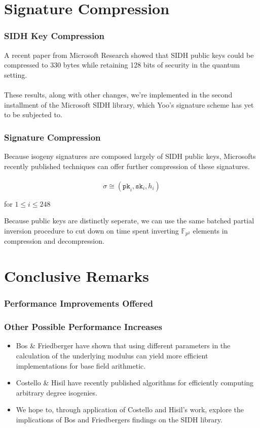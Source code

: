 \documentclass{beamer}
\begin{document}
\section{Signature Compression}

\begin{frame}
\frametitle{SIDH Key Compression}
A recent paper from Microsoft Research showed that SIDH public keys could be compressed to 330 bytes while retaining 128 bits of security in the quantum setting.\\~\\

These results, along with other changes, we're implemented in the second installment of the Microsoft SIDH library, which Yoo's signature scheme has yet to be subjected to.\\
\end{frame}

\begin{frame}
\frametitle{Signature Compression}
Because isogeny signatures are composed largely of SIDH public keys, Microsofts recently published techniques can offer further compression of these signatures.\\~\\

$$
\sigma \cong (\texttt{pk}_i, \texttt{sk}_i, h_i)
$$
\begin{center}for $1 \leq i \leq 248$\end{center}

Because public keys are distinctly seperate, we can use the same batched partial inversion procedure to cut down on time spent inverting $\mathbb{F}_{p^{2}}$ elements in compression and decompression.
\end{frame}

\section{Conclusive Remarks}

\begin{frame}
\frametitle{Performance Improvements Offered}
\end{frame}

\begin{frame}
\frametitle{Other Possible Performance Increases}
\begin{itemize}
\item Bos \& Friedberger have shown that using different parameters in the calculation of the underlying modulus can yield more efficient implementations for base field arithmetic.
\item Costello \& Hisil have recently published algorithms for efficiently computing arbitrary degree isogenies.
\item We hope to, through application of Costello and Hisil's work, explore the implications of Bos and Friedbergers findings on the SIDH library.\\
\end{itemize}
\end{frame}
\end{document}
